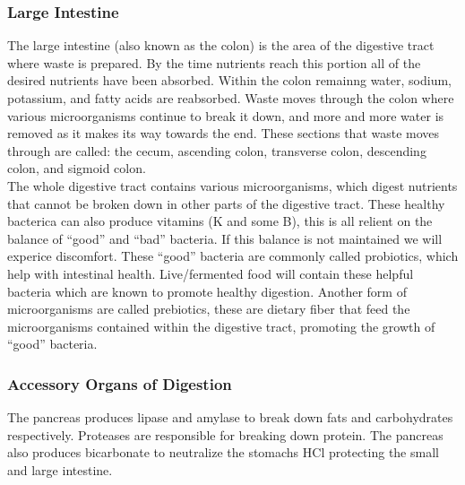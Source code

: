 \documentclass[letterpaper, 11pt]{article}
\begin{document}
\subsubsection{Large Intestine}
\label{sec:orga08c9d4}
The large intestine (also known as the colon) is the area of the digestive tract where waste is prepared. By the time nutrients reach this portion all of the desired nutrients have been absorbed. Within the colon remainng water, sodium, potassium, and fatty acids are reabsorbed. Waste moves through the colon where various microorganisms continue to break it down, and more and more water is removed as it makes its way towards the end. These sections that waste moves through are called: the cecum, ascending colon, transverse colon, descending colon, and sigmoid colon.\\
The whole digestive tract contains various microorganisms, which digest nutrients that cannot be broken down in other parts of the digestive tract. These healthy bacterica can also produce vitamins (K and some B), this is all relient on the balance of ``good'' and ``bad'' bacteria. If this balance is not maintained we will experice discomfort. These ``good'' bacteria are commonly called probiotics, which help with intestinal health. Live/fermented food will contain these helpful bacteria which are known to promote healthy digestion. Another form of microorganisms are called prebiotics, these are dietary fiber that feed the microorganisms contained within the digestive tract, promoting the growth of ``good'' bacteria.\\
\subsubsection{Accessory Organs of Digestion}
\label{sec:org5900919}
The pancreas produces lipase and amylase to break down fats and carbohydrates respectively. Proteases are responsible for breaking down protein. The pancreas also produces bicarbonate to neutralize the stomachs HCl protecting the small and large intestine.\\
\end{document}
